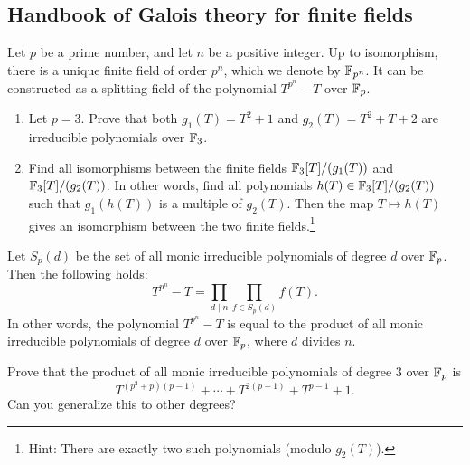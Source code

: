 \newpage

\subsection{Handbook of Galois theory for finite fields}
\label{subsec:handbook_galois_ff}

\begin{theorem}
    Let $p$ be a prime number, and let $n$ be a positive integer.
    Up to isomorphism, there is a unique finite field of order $p^n$, which we denote by $\mathbb{F}_{p^n}$.
    It can be constructed as a splitting field of the polynomial $T^{p^n} - T$ over $\mathbb{F}_p$.
\end{theorem}

\begin{exercise}
    \begin{enumerate}
        \item Let $p = 3$. Prove that both $g_1(T) = T^2 + 1$ and $g_2(T) = T^2 + T + 2$ are irreducible polynomials over $\mathbb{F}_3$.
        \item Find all isomorphisms between the finite fields $\mathbb{F}_3[T] / (g_1(T))$ and $\mathbb{F}_3[T] / (g_2(T))$.
        In other words, find all polynomials $h(T) \in \mathbb{F}_3[T] / (g_2(T))$ such that $g_1(h(T))$ is a multiple of $g_2(T)$.
        Then the map $T \mapsto h(T)$ gives an isomorphism between the two finite fields.\footnote{Hint: There are exactly two such polynomials (modulo $g_2(T)$).}
    \end{enumerate}
\end{exercise}

\begin{theorem}
    Let $S_{p}(d)$ be the set of all monic irreducible polynomials of degree $d$ over $\mathbb{F}_p$.
    Then the following holds:
    \begin{equation}
        T^{p^n} - T = \prod_{d \mid n} \prod_{f \in S_p(d)} f(T).
    \end{equation}
    In other words, the polynomial $T^{p^n} - T$ is equal to the product of all monic irreducible polynomials of degree $d$ over $\mathbb{F}_p$, where $d$ divides $n$.
\end{theorem}

\begin{exercise}
    Prove that the product of all monic irreducible polynomials of degree $3$ over $\mathbb{F}_p$ is
    \[
        T^{(p^2 + p)(p - 1)} + \cdots + T^{2(p-1)} + T^{p-1} + 1.
    \]
    Can you generalize this to other degrees?
\end{exercise}

